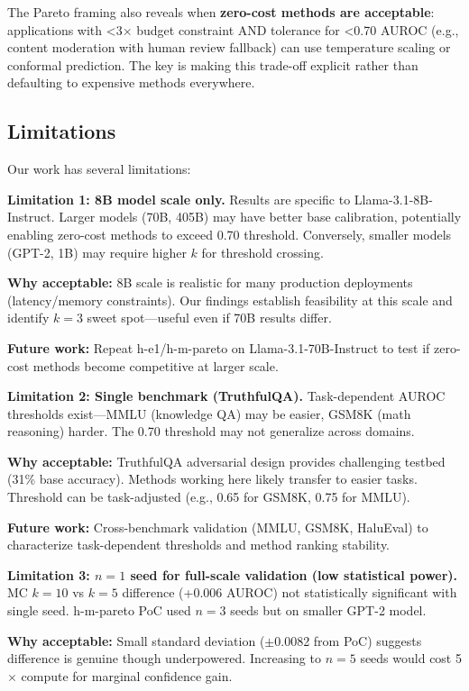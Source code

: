 The Pareto framing also reveals when \textbf{zero-cost methods are acceptable}: applications with <3$\times$ budget constraint AND tolerance for <0.70 AUROC (e.g., content moderation with human review fallback) can use temperature scaling or conformal prediction. The key is making this trade-off explicit rather than defaulting to expensive methods everywhere.

\subsection{Limitations}

Our work has several limitations:

\textbf{Limitation 1: 8B model scale only.} Results are specific to Llama-3.1-8B-Instruct. Larger models (70B, 405B) may have better base calibration, potentially enabling zero-cost methods to exceed 0.70 threshold. Conversely, smaller models (GPT-2, 1B) may require higher $k$ for threshold crossing.

\textbf{Why acceptable:} 8B scale is realistic for many production deployments (latency/memory constraints). Our findings establish feasibility at this scale and identify $k=3$ sweet spot---useful even if 70B results differ.

\textbf{Future work:} Repeat h-e1/h-m-pareto on Llama-3.1-70B-Instruct to test if zero-cost methods become competitive at larger scale.

\textbf{Limitation 2: Single benchmark (TruthfulQA).} Task-dependent AUROC thresholds exist---MMLU (knowledge QA) may be easier, GSM8K (math reasoning) harder. The 0.70 threshold may not generalize across domains.

\textbf{Why acceptable:} TruthfulQA adversarial design provides challenging testbed (31\% base accuracy). Methods working here likely transfer to easier tasks. Threshold can be task-adjusted (e.g., 0.65 for GSM8K, 0.75 for MMLU).

\textbf{Future work:} Cross-benchmark validation (MMLU, GSM8K, HaluEval) to characterize task-dependent thresholds and method ranking stability.

\textbf{Limitation 3: $n=1$ seed for full-scale validation (low statistical power).} MC $k=10$ vs $k=5$ difference (+0.006 AUROC) not statistically significant with single seed. h-m-pareto PoC used $n=3$ seeds but on smaller GPT-2 model.

\textbf{Why acceptable:} Small standard deviation ($\pm$0.0082 from PoC) suggests difference is genuine though underpowered. Increasing to $n=5$ seeds would cost 5$\times$ compute for marginal confidence gain.

